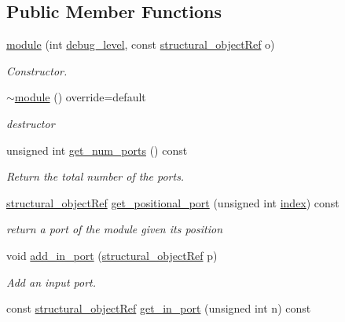 \subsection*{Public Member Functions}
\begin{DoxyCompactItemize}
\item 
\hyperlink{classmodule_ab953ed86706d8e75b11d03f91094fe56}{module} (int \hyperlink{classstructural__object_ac2744292aa7f0fca3742133d16bb3201}{debug\+\_\+level}, const \hyperlink{structural__objects_8hpp_a8ea5f8cc50ab8f4c31e2751074ff60b2}{structural\+\_\+object\+Ref} o)
\begin{DoxyCompactList}\small\item\em Constructor. \end{DoxyCompactList}\item 
\hyperlink{classmodule_acaee0dee4568e07a61e47c4e6f2cc7a0}{$\sim$module} () override=default
\begin{DoxyCompactList}\small\item\em destructor \end{DoxyCompactList}\item 
unsigned int \hyperlink{classmodule_ad80631ef6588f68f317ee6ac7d9067a9}{get\+\_\+num\+\_\+ports} () const
\begin{DoxyCompactList}\small\item\em Return the total number of the ports. \end{DoxyCompactList}\item 
\hyperlink{structural__objects_8hpp_a8ea5f8cc50ab8f4c31e2751074ff60b2}{structural\+\_\+object\+Ref} \hyperlink{classmodule_afadd1842b848bde0a9893f4928029c2a}{get\+\_\+positional\+\_\+port} (unsigned int \hyperlink{tutorial__pact__2019_2Introduction_2third_2include_2Keccak_8h_a028c9bdc8344cca38ab522a337074797}{index}) const
\begin{DoxyCompactList}\small\item\em return a port of the module given its position \end{DoxyCompactList}\item 
void \hyperlink{classmodule_a0d2631447deb34621ff56d33e2d9ba13}{add\+\_\+in\+\_\+port} (\hyperlink{structural__objects_8hpp_a8ea5f8cc50ab8f4c31e2751074ff60b2}{structural\+\_\+object\+Ref} p)
\begin{DoxyCompactList}\small\item\em Add an input port. \end{DoxyCompactList}\item 
const \hyperlink{structural__objects_8hpp_a8ea5f8cc50ab8f4c31e2751074ff60b2}{structural\+\_\+object\+Ref} \hyperlink{classmodule_a0e39b683ccf93e8a47bb227430ed3233}{get\+\_\+in\+\_\+port} (unsigned int n) const

\end{DoxyCompactItemize}
